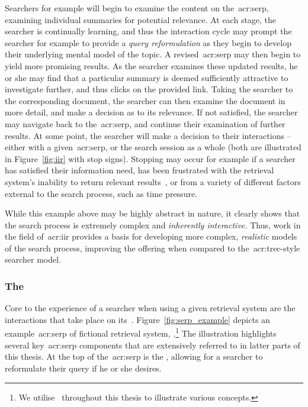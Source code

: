 Searchers for example will begin to examine the content on the~\gls{acr:serp}, examining individual summaries for potential relevance. At each stage, the searcher is continually learning, and thus the interaction cycle may prompt the searcher for example to provide a \emph{query reformulation} as they begin to develop their underlying mental model of the topic. A revised~\gls{acr:serp} may then begin to yield more promising results. As the searcher examines these updated results, he or she may find that a particular summary is deemed sufficiently attractive to investigate further, and thus clicks on the provided link. Taking the searcher to the corresponding document, the searcher can then examine the document in more detail, and make a decision as to its relevance. If not satisfied, the searcher may navigate back to the~\gls{acr:serp}, and continue their examination of further results. At some point, the searcher will make a decision to  their interactions -- either with a given~\gls{acr:serp}, or the search session as a whole (both are illustrated in Figure~\ref{fig:iir} with stop signs). Stopping may occur for example if a searcher has satisfied their information need, has been frustrated with the retrieval system's inability to return relevant results~\citep{cooper1973retrieval_effectiveness_ii}, or from a variety of different factors external to the search process, such as time pressure.

While this example above may be highly abstract in nature, it clearly shows that the search process is extremely complex and \emph{inherently interactive.} Thus, work in the field of~\gls{acr:iir} provides a basis for developing more complex, \emph{realistic} models of the search process, improving the offering when compared to the~\gls{acr:trec}-style searcher model.

\subsubsection{The~}\label{sec:ir_background:user:iir:serp}
Core to the experience of a searcher when using a given retrieval system are the interactions that take place on its~. Figure~\ref{fig:serp_example} depicts an example~\gls{acr:serp} of fictional retrieval system, \searchlogo.\footnote{We utilise \searchlogo~throughout this thesis to illustrate various concepts.} The illustration highlights several key~\gls{acr:serp} components that are extensively referred to in latter parts of this thesis. At the top of the~\gls{acr:serp} is the , allowing for a searcher to reformulate their query if he or she desires.

